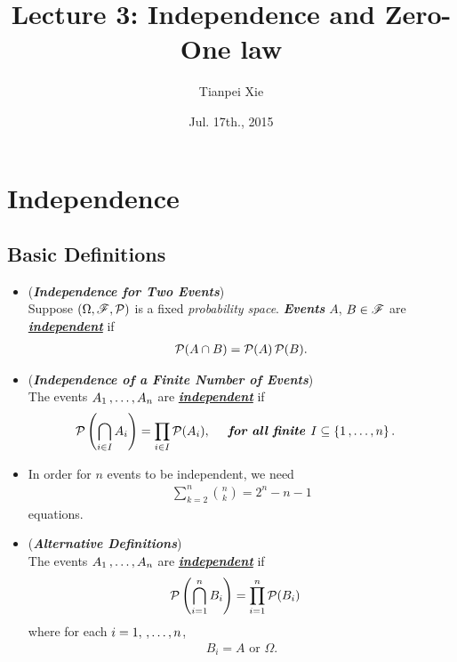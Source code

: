\documentclass[11pt]{article}
\begin{document}
\title{Lecture 3: Independence and Zero-One law}
\author{ Tianpei Xie}
\date{ Jul. 17th., 2015 }
\maketitle
\tableofcontents
\newpage
\section{Independence}
\subsection{Basic Definitions}
\begin{itemize}
\item \begin{definition} (\emph{\textbf{Independence for Two Events}})\\
Suppose  $(\Omega, {\mathscr F}, {\mathcal P})$ is a fixed \emph{probability space}. \emph{\textbf{Events}} $A$, $B \in {\mathscr F}$ are \underline{\emph{\textbf{independent}}} if
\begin{align*}
{\mathcal P}(A \cap B) = {\mathcal P}(A) \, {\mathcal P}(B).
\end{align*}
\end{definition}

\item \begin{definition} (\emph{\textbf{Independence of a Finite Number of Events}})\\
The events $A_1 \,{,}\ldots{,}\, A_n$ are  \underline{\emph{\textbf{independent}}} if
\begin{align*}
{\mathcal P}\left(\bigcap_{i \in I} A_i\right) &= \prod_{i \in I}{\mathcal P}(A_i), \quad\text{\emph{\textbf{ for all finite }}}I \subseteq \left\{1 \,{,}\ldots{,}\, n\right\}. 
\end{align*}
\end{definition}

\item \begin{remark}
In order for $n$ events to be independent, we need 
\begin{align*}
\sum_{k=2}^{n}{{n}\choose{k}} = 2^n - n - 1
\end{align*} equations.
\end{remark}

\item \begin{remark} (\emph{\textbf{Alternative Definitions}})\\
The events $A_1 \,{,}\ldots{,}\, A_n$ are  \underline{\emph{\textbf{independent}}} if
\begin{align*}
{\mathcal P}\left(\bigcap_{i = 1}^{n} B_i\right) &= \prod_{i =1}^{n}{\mathcal P}(B_i)
\end{align*}
where for each $i = 1,\,{,}\ldots{,}\, n$, 
\begin{align*}
B_i = A\text{ or }\Omega.
\end{align*}
\end{remark}


\end{itemize}
\end{document}
